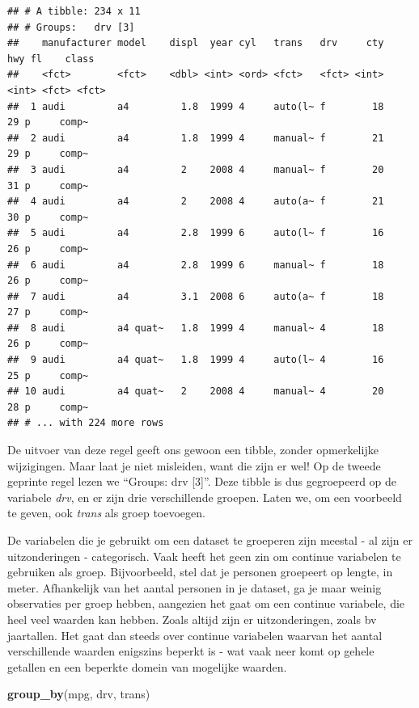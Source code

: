 \documentclass[]{tufte-book}
\newenvironment{Shaded}{}{}
\newcommand{\KeywordTok}[1]{\textcolor[rgb]{0.00,0.44,0.13}{\textbf{#1}}}
\newcommand{\NormalTok}[1]{#1}
\begin{document}
\begin{verbatim}
## # A tibble: 234 x 11
## # Groups:   drv [3]
##    manufacturer model    displ  year cyl   trans   drv     cty   hwy fl    class
##    <fct>        <fct>    <dbl> <int> <ord> <fct>   <fct> <int> <int> <fct> <fct>
##  1 audi         a4         1.8  1999 4     auto(l~ f        18    29 p     comp~
##  2 audi         a4         1.8  1999 4     manual~ f        21    29 p     comp~
##  3 audi         a4         2    2008 4     manual~ f        20    31 p     comp~
##  4 audi         a4         2    2008 4     auto(a~ f        21    30 p     comp~
##  5 audi         a4         2.8  1999 6     auto(l~ f        16    26 p     comp~
##  6 audi         a4         2.8  1999 6     manual~ f        18    26 p     comp~
##  7 audi         a4         3.1  2008 6     auto(a~ f        18    27 p     comp~
##  8 audi         a4 quat~   1.8  1999 4     manual~ 4        18    26 p     comp~
##  9 audi         a4 quat~   1.8  1999 4     auto(l~ 4        16    25 p     comp~
## 10 audi         a4 quat~   2    2008 4     manual~ 4        20    28 p     comp~
## # ... with 224 more rows
\end{verbatim}

De uitvoer van deze regel geeft ons gewoon een tibble, zonder opmerkelijke wijzigingen. Maar laat je niet misleiden, want die zijn er wel! Op de tweede geprinte regel lezen we ``Groups: drv {[}3{]}''. Deze tibble is dus gegroepeerd op de variabele \emph{drv}, en er zijn drie verschillende groepen. Laten we, om een voorbeeld te geven, ook \emph{trans} als groep toevoegen.

De variabelen die je gebruikt om een dataset te groeperen zijn meestal - al zijn er uitzonderingen - categorisch. Vaak heeft het geen zin om continue variabelen te gebruiken als groep. Bijvoorbeeld, stel dat je personen groepeert op lengte, in meter. Afhankelijk van het aantal personen in je dataset, ga je maar weinig observaties per groep hebben, aangezien het gaat om een continue variabele, die heel veel waarden kan hebben. Zoals altijd zijn er uitzonderingen, zoals bv jaartallen. Het gaat dan steeds over continue variabelen waarvan het aantal verschillende waarden enigszins beperkt is - wat vaak neer komt op gehele getallen en een beperkte domein van mogelijke waarden.

\begin{Shaded}
\begin{Highlighting}[]
\KeywordTok{group_by}\NormalTok{(mpg, drv, trans)}
\end{Highlighting}
\end{Shaded}
\end{document}
